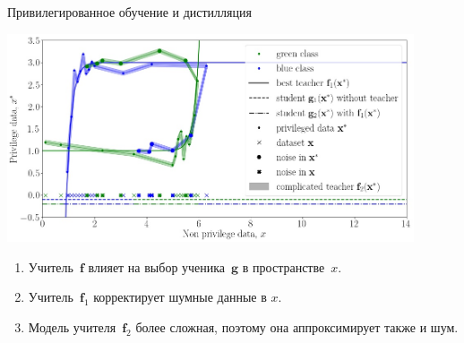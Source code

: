 \documentclass[10pt,pdf,hyperref={unicode}]{beamer}
\begin{document}

\begin{frame}{Привилегированное обучение и дистилляция}
\justifying
\begin{center}
	\includegraphics[width=0.9\textwidth]{figures/explanation}
\end{center}

\begin{enumerate}
    \item Учитель~$\mathbf{f}$ влияет на выбор ученика~$\mathbf{g}$ в пространстве~$x$.
    \item Учитель~$\mathbf{f}_1$ корректирует шумные данные в $x$.
    \item Модель учителя~$\mathbf{f}_2$ более сложная, поэтому она аппроксимирует также и шум.
\end{enumerate}

\end{frame}
\end{document}
